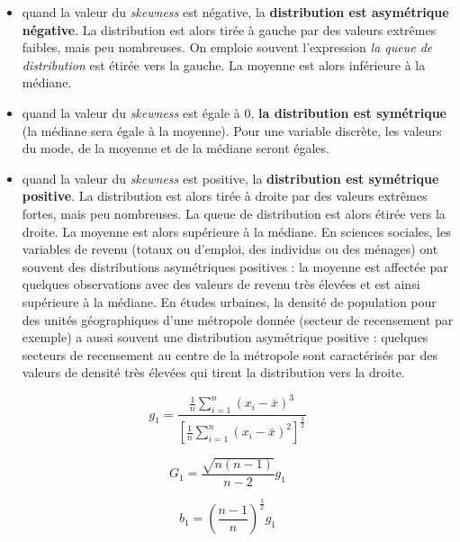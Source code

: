 \documentclass[
  11pt,
  french,
]{book}
\providecommand{\tightlist}{%
  \setlength{\itemsep}{0pt}\setlength{\parskip}{0pt}}
\begin{document}
\begin{itemize}
\tightlist
\item
  quand la valeur du \emph{skewness} est négative, la \textbf{distribution est asymétrique négative}. La distribution est alors tirée à gauche par des valeurs extrêmes faibles, mais peu nombreuses. On emploie souvent l'expression \emph{la queue de distribution} est étirée vers la gauche. La moyenne est alors inférieure à la médiane.
\item
  quand la valeur du \emph{skewness} est égale à 0, \textbf{la distribution est symétrique} (la médiane sera égale à la moyenne). Pour une variable discrète, les valeurs du mode, de la moyenne et de la médiane seront égales.
\item
  quand la valeur du \emph{skewness} est positive, la \textbf{distribution est symétrique positive}. La distribution est alors tirée à droite par des valeurs extrêmes fortes, mais peu nombreuses. La queue de distribution est alors étirée vers la droite. La moyenne est alors supérieure à la médiane. En sciences sociales, les variables de revenu (totaux ou d'emploi, des individus ou des ménages) ont souvent des distributions asymétriques positives : la moyenne est affectée par quelques observations avec des valeurs de revenu très élevées et est ainsi supérieure à la médiane. En études urbaines, la densité de population pour des unités géographiques d'une métropole donnée (secteur de recensement par exemple) a aussi souvent une distribution asymétrique positive : quelques secteurs de recensement au centre de la métropole sont caractérisés par des valeurs de densité très élevées qui tirent la distribution vers la droite.
\end{itemize}

\begin{equation} 
g_1=\frac{ \frac{1}{n} \sum_{i=1}^n(x_i-\bar{x})^3} { \left[\frac{1}{n}\sum_{i=1}^n(x_i-\bar{x})^2\right] ^\frac{3}{2}}
\label{eq:SkewType1}
\end{equation}

\begin{equation} 
G_1= \frac{\sqrt{n(n-1)}}{n-2} g_1
\label{eq:SkewType2}
\end{equation}

\begin{equation} 
b_1= \left( \frac{n-1}{n} \right) ^\frac{3}{2} g_1
\label{eq:SkewType3}
\end{equation}
\end{document}
